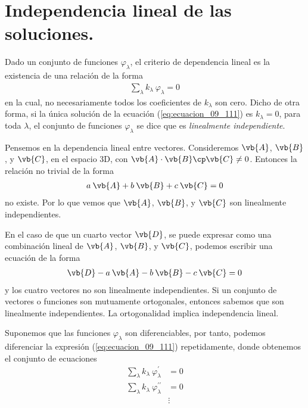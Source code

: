 \section{Independencia lineal de las soluciones.}
Dado un conjunto de funciones $\varphi_{\lambda}$, el criterio de dependencia lineal es la existencia de una relación de la forma
\begin{align}
\sum_{\lambda} k_{\lambda} \: \varphi_{\lambda} = 0 
\label{eq:ecuacion_09_111}
\end{align}
en la cual, no necesariamente todos los coeficientes de $k_{\lambda}$ son cero. Dicho de otra forma, si la única solución de la ecuación (\ref{eq:ecuacion_09_111}) es $k_{\lambda} = 0$, para toda $\lambda$, el conjunto de funciones $\varphi_{\lambda}$ se dice que es \emph{linealmente independiente}.
\par
Pensemos en la dependencia lineal entre vectores. Consideremos $\vb{A}$, $\vb{B}$, y $\vb{C}$, en el espacio 3D, con $\vb{A} \cdot \vb{B} \cp \vb{C} \neq 0$. Entonces la relación no trivial de la forma
\begin{align}
a \: \vb{A} + b \: \vb{B} + c \: \vb{C} = 0
\label{eq:ecuacion_09_112}
\end{align}
no existe. Por lo que vemos que $\vb{A}$, $\vb{B}$, y $\vb{C}$ son linealmente independientes.
\par
En el caso de que un cuarto vector $\vb{D}$, se puede expresar como una combinación lineal de $\vb{A}$, $\vb{B}$, y $\vb{C}$, podemos escribir una ecuación de la forma
\begin{align}
\vb{D} -  a \: \vb{A} - b \: \vb{B} - c \: \vb{C} = 0
\label{eq:ecuacion_09_113}
\end{align}
y los cuatro vectores no son linealmente independientes. Si un conjunto de vectores o funciones son mutuamente ortogonales, entonces sabemos que son linealmente independientes. La ortogonalidad implica independencia lineal.
\par
Suponemos que las funciones $\varphi_{\lambda}$ son diferenciables, por tanto, podemos diferenciar la expresión (\ref{eq:ecuacion_09_111}) repetidamente, donde obtenemos el conjunto de ecuaciones
\begin{align}
\sum_{\lambda} k_{\lambda} \: \varphi^{\prime}_{\lambda} &= 0 \label{eq:ecuacion_09_114} \\[0.5em]
\sum_{\lambda} k_{\lambda} \: \varphi^{\prime \prime}_{\lambda} &= 0 \label{eq:ecuacion_09_115} \\[0.5em]
&\vdots \nonumber
\end{align}
